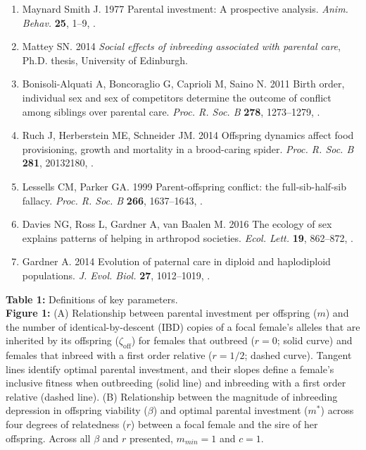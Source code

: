 \documentclass[12pt]{article}
\begin{document}
\begin{enumerate}
\item{Maynard Smith J. 1977 {Parental investment: A prospective analysis}.
  \textit{Anim. Behav.} \textbf{25}, 1--9,
  .}

\item{Mattey SN. 2014 \textit{{Social effects of inbreeding associated with
  parental care}}, Ph.D. thesis, University of Edinburgh.}

\item{Bonisoli-Alquati A, Boncoraglio G, Caprioli M, Saino N. 2011 {Birth
  order, individual sex and sex of competitors determine the outcome of
  conflict among siblings over parental care.} \textit{Proc. R. Soc. B}
  \textbf{278}, 1273--1279, .}

\item{Ruch J, Herberstein ME, Schneider JM. 2014 {Offspring dynamics
  affect food provisioning, growth and mortality in a brood-caring spider}.
  \textit{Proc. R. Soc. B} \textbf{281}, 20132180,
  .}

\item{Lessells CM, Parker GA. 1999 {Parent-offspring conflict: the
  full-sib-half-sib fallacy}. \textit{Proc. R. Soc. B}
  \textbf{266}, 1637--1643, .}

\item{Davies NG, Ross L, Gardner A, van Baalen M. 2016 {The ecology of
  sex explains patterns of helping in arthropod societies}. \textit{Ecol.
  Lett.} \textbf{19}, 862--872, .}

\item{Gardner A. 2014 {Evolution of paternal care in diploid and haplodiploid populations.}
  \textit{J. Evol. Biol.} \textbf{27}, 1012–1019, .}

\end{enumerate}

\clearpage

\noindent \textbf{Table 1:}  Definitions of key parameters. \\

\noindent \textbf{Figure 1:} (A) Relationship between parental investment per offspring ($m$) and the number of identical-by-descent (IBD) copies of a focal female's alleles that are inherited by its offspring ($\zeta_{\textrm{off}}$) for females that outbreed ($r=0$; solid curve) and females that inbreed with a first order relative ($r=1/2$; dashed curve). Tangent lines identify optimal parental investment, and their slopes define a female's inclusive fitness when outbreeding (solid line) and inbreeding with a first order relative (dashed line). (B) Relationship between the magnitude of inbreeding depression in offspring viability ($\beta$) and optimal parental investment ($m^{*}$) across four degrees of relatedness ($r$) between a focal female and the sire of her offspring. Across all $\beta$ and $r$ presented, $m_{min}=1$ and $c=1$. \\
\end{document}
